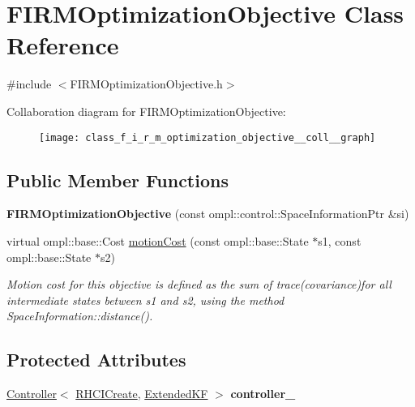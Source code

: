 \hypertarget{class_f_i_r_m_optimization_objective}{\section{\-F\-I\-R\-M\-Optimization\-Objective \-Class \-Reference}
\label{class_f_i_r_m_optimization_objective}
}


{\ttfamily \#include $<$\-F\-I\-R\-M\-Optimization\-Objective.\-h$>$}



\-Collaboration diagram for \-F\-I\-R\-M\-Optimization\-Objective\-:
\nopagebreak
\begin{figure}[H]
\begin{center}
\leavevmode
\texttt{[image: class\_f\_i\_r\_m\_optimization\_objective\_\_coll\_\_graph]}
\end{center}
\end{figure}
\subsection*{\-Public \-Member \-Functions}
\begin{DoxyCompactItemize}
\item 
\hypertarget{class_f_i_r_m_optimization_objective_a230cd65e9c2c9d9d668eca55b9a9c537}{{\bfseries \-F\-I\-R\-M\-Optimization\-Objective} (const ompl\-::control\-::\-Space\-Information\-Ptr \&si)}\label{class_f_i_r_m_optimization_objective_a230cd65e9c2c9d9d668eca55b9a9c537}

\item 
\hypertarget{class_f_i_r_m_optimization_objective_a161f7e9f76e46cfb65a80109535c0bd1}{virtual ompl\-::base\-::\-Cost \hyperlink{class_f_i_r_m_optimization_objective_a161f7e9f76e46cfb65a80109535c0bd1}{motion\-Cost} (const ompl\-::base\-::\-State $\ast$s1, const ompl\-::base\-::\-State $\ast$s2)}\label{class_f_i_r_m_optimization_objective_a161f7e9f76e46cfb65a80109535c0bd1}

\begin{DoxyCompactList}\small\item\em \-Motion cost for this objective is defined as the sum of trace(covariance)for all intermediate states between {\itshape s1\/} and {\itshape s2\/}, using the method \-Space\-Information\-::distance(). \end{DoxyCompactList}\end{DoxyCompactItemize}
\subsection*{\-Protected \-Attributes}
\begin{DoxyCompactItemize}
\item 
\hypertarget{class_f_i_r_m_optimization_objective_ac8f288ac2a63ec1830889e2f146acbe6}{\hyperlink{class_controller}{\-Controller}$<$ \hyperlink{class_r_h_c_i_create}{\-R\-H\-C\-I\-Create}, \*
\hyperlink{class_extended_k_f}{\-Extended\-K\-F} $>$ {\bfseries controller\-\_\-}}\label{class_f_i_r_m_optimization_objective_ac8f288ac2a63ec1830889e2f146acbe6}

\end{DoxyCompactItemize}


